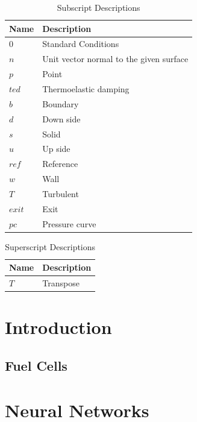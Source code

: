 \documentclass{report}
\begin{document}
    \begin{table}[H]
    \centering
    \begin{tabularx}{\textwidth}{AB}
    \toprule
    \textbf{Name} & \textbf{Description} \\ 
    \midrule
    \( 0 \) & Standard Conditions \\ 
    \( n \) & Unit vector normal to the given surface \\ 
    \( p \) & Point \\ 
    \( ted \) & Thermoelastic damping \\ 
    \( b \) & Boundary \\ 
    \( d \) & Down side \\ 
    \( s \) & Solid \\ 
    \( u \) & Up side \\ 
    \( ref \) & Reference \\ 
    \( w \) & Wall \\ 
    \( T \) & Turbulent \\ 
    \( exit \) & Exit \\ 
    \( pc \) & Pressure curve \\ 
    \bottomrule
    \end{tabularx}
    \caption{Subscript Descriptions}
    \label{tab:subscripts}
    \end{table}

    \begin{table}[H]
    \centering
    \begin{tabularx}{\textwidth}{AB}
    \toprule
    \textbf{Name} & \textbf{Description} \\ 
    \midrule
    \( T \) & Transpose \\ 
    \bottomrule
    \end{tabularx}
    \caption{Superscript Descriptions}
    \label{tab:superscripts}
    \end{table}

\newpage \chapter{Introduction}
\section{Fuel Cells}

\newpage \chapter{Neural Networks}
\end{document}
